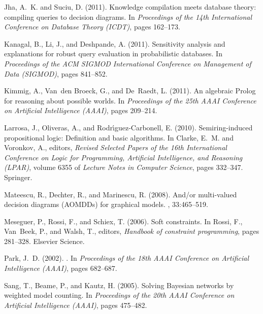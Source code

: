 \documentclass{article}
\theoremstyle{plain}
\theoremstyle{definition}
\begin{document}
\begin{thebibliography}{}
Jha, A.~K. and Suciu, D. (2011).
\newblock Knowledge compilation meets database theory: compiling queries to
  decision diagrams.
\newblock In {\em Proceedings of the 14th International Conference on Database
  Theory (ICDT)}, pages 162--173.

Kanagal, B., Li, J., and Deshpande, A. (2011).
\newblock Sensitivity analysis and explanations for robust query evaluation in
  probabilistic databases.
\newblock In {\em Proceedings of the ACM SIGMOD International Conference on
  Management of Data (SIGMOD)}, pages 841--852.

Kimmig, A., Van~den Broeck, G., and De~Raedt, L. (2011).
\newblock An algebraic {P}rolog for reasoning about possible worlds.
\newblock In {\em Proceedings of the 25th AAAI Conference on Artificial
  Intelligence (AAAI)}, pages 209--214.

Larrosa, J., Oliveras, A., and Rodr\'{\i}guez-Carbonell, E. (2010).
\newblock Semiring-induced propositional logic: Definition and basic
  algorithms.
\newblock In Clarke, E.~M. and Voronkov, A., editors, {\em Revised Selected
  Papers of the 16th International Conference on Logic for Programming,
  Artificial Intelligence, and Reasoning (LPAR)}, volume 6355 of {\em Lecture
  Notes in Computer Science}, pages 332--347. Springer.

Mateescu, R., Dechter, R., and Marinescu, R. (2008).
\newblock And/or multi-valued decision diagrams ({AOMDDs}) for graphical
  models.
, 33:465--519.

Meseguer, P., Rossi, F., and Schiex, T. (2006).
\newblock Soft constraints.
\newblock In Rossi, F., Van~Beek, P., and Walsh, T., editors, {\em Handbook of
  constraint programming}, pages 281--328. Elsevier Science.

Park, J.~D. (2002).
.
\newblock In {\em Proceedings of the 18th AAAI Conference on Artificial
  Intelligence (AAAI)}, pages 682--687.

Sang, T., Beame, P., and Kautz, H. (2005).
\newblock Solving {B}ayesian networks by weighted model counting.
\newblock In {\em Proceedings of the 20th AAAI Conference on Artificial
  Intelligence (AAAI)}, pages 475--482.


\end{thebibliography}
\end{document}
